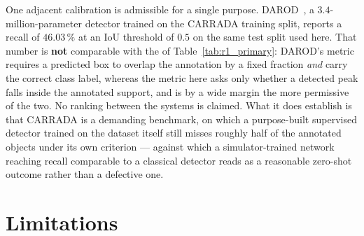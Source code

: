One adjacent calibration is admissible for a single purpose. DAROD~\cite{decourt2022darod}, a
$3.4$-million-parameter detector trained on the CARRADA training split, reports a recall of
$46.03\,\%$ at an IoU threshold of $0.5$ on the same test split used here. That number is
\textbf{not} comparable with the \RoneTinyCNN{} of Table~\ref{tab:r1_primary}: DAROD's metric
requires a predicted box to overlap the annotation by a fixed fraction \emph{and} carry the correct
class label, whereas the metric here asks only whether a detected peak falls inside the annotated
support, and is by a wide margin the more permissive of the two. No ranking between the systems is
claimed. What it does establish is that CARRADA is a demanding benchmark, on which a purpose-built
supervised detector trained on the dataset itself still misses roughly half of the annotated objects
under its own criterion --- against which a simulator-trained network reaching recall comparable to a
classical detector reads as a reasonable zero-shot outcome rather than a defective one.

\section{Limitations}
\label{sec:limits}

